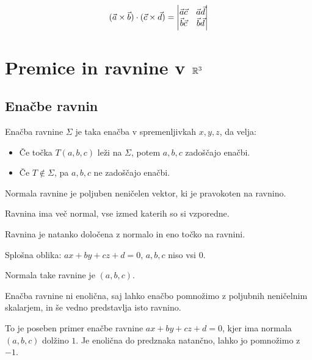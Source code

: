 
\[
	(\vec{a} \times \vec{b}) \cdot (\vec{c} \times \vec{d}) = \begin{vmatrix}
		\vec{a} \vec{c} & \vec{a} \vec{d} \\
		\vec{b} \vec{c} & \vec{b} \vec{d}
	\end{vmatrix}
\]

\section{Premice in ravnine v $\mathbb{R}^3$}

\subsection{Enačbe ravnin}


Enačba ravnine $\Sigma$ je taka enačba v spremenljivkah $x,y,z$, da velja:
\begin{itemize}
	\item Če točka $T(a,b,c)$ leži na $\Sigma$, potem $a, b, c$ zadoščajo enačbi.
	\item Če $T \notin \Sigma$, pa $a, b, c$ ne zadoščajo enačbi.
\end{itemize}


Normala ravnine je poljuben neničelen vektor, ki je pravokoten na ravnino.

Ravnina ima več normal, vse izmed katerih so si vzporedne.

Ravnina je natanko določena z normalo in eno točko na ravnini.


Splošna oblika: $ax + by + cz + d = 0$, $a, b, c$ niso vsi $0$.

Normala take ravnine je $(a, b, c)$.

Enačba ravnine ni enolična, saj lahko enačbo pomnožimo z poljubnih neničelnim skalarjem, in še vedno predstavlja isto ravnino.


To je poseben primer enačbe ravnine $ax + by + cz + d = 0$, kjer ima normala $(a, b, c)$ dolžino $1$. Je enolična do predznaka natančno, lahko jo pomnožimo z $-1$.

